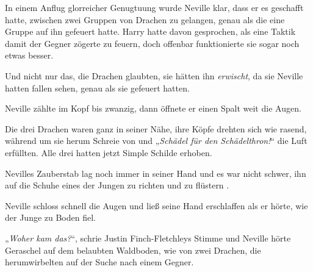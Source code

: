 In einem Anflug glorreicher Genugtuung wurde Neville klar, dass er es geschafft hatte, zwischen zwei Gruppen von Drachen zu gelangen, genau als die eine Gruppe auf ihn gefeuert hatte. Harry hatte davon gesprochen, als eine Taktik damit der Gegner zögerte zu feuern, doch offenbar funktionierte sie sogar noch etwas besser.

Und nicht nur das, die Drachen glaubten, sie hätten ihn \emph{erwischt}, da sie Neville hatten fallen sehen, genau als sie gefeuert hatten.

Neville zählte im Kopf bis zwanzig, dann öffnete er einen Spalt weit die Augen.

Die drei Drachen waren ganz in seiner Nähe, ihre Köpfe drehten sich wie rasend, während um sie herum Schreie von  und
„\emph{Schädel für den Schädelthron!}“ die Luft erfüllten. Alle drei hatten jetzt Simple Schilde erhoben.

Nevilles Zauberstab lag noch immer in seiner Hand und es war nicht schwer, ihn auf die Schuhe eines der Jungen zu richten und zu flüstern .

Neville schloss schnell die Augen und ließ seine Hand erschlaffen als er hörte, wie der Junge zu Boden fiel.

„\emph{Woher kam das?}“, schrie Justin Finch-Fletchleys Stimme und Neville hörte Geraschel auf dem belaubten Waldboden, wie von zwei Drachen, die herumwirbelten auf der Suche nach einem Gegner.

